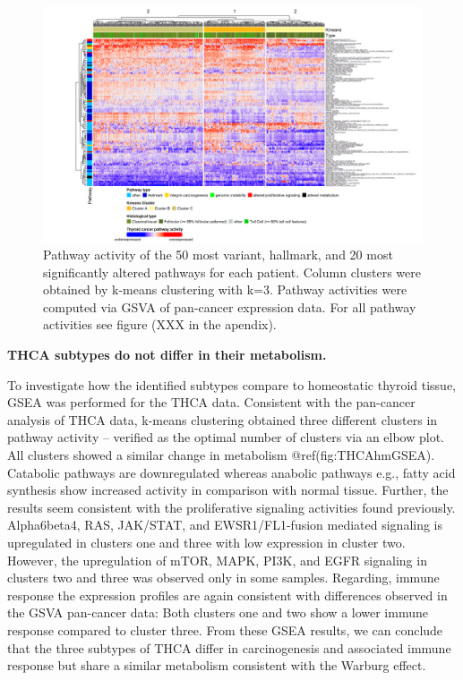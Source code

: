 \documentclass[
  parskip,
  oneside]{scrreprt}
\begin{document}
\begin{figure}

{\centering \includegraphics[width=1\linewidth]{figures/THCA Heatmap from Pancancer data top 50 pathways} 

}

\caption{Pathway activity of the 50 most variant, hallmark, and 20 most significantly altered pathways for each patient. Column clusters were obtained by k-means clustering with k=3. Pathway activities were computed via GSVA of pan-cancer expression data. For all pathway activities see figure (XXX in the apendix).}\label{fig:THCAhm}
\end{figure}

\textbf{THCA subtypes do not differ in their metabolism.}

To investigate how the identified subtypes compare to homeostatic
thyroid tissue, GSEA was performed for the THCA data. Consistent with
the pan-cancer analysis of THCA data, k-means clustering obtained three
different clusters in pathway activity -- verified as the optimal number
of clusters via an elbow plot. All clusters showed a similar change in
metabolism @ref(fig:THCAhmGSEA). Catabolic pathways are downregulated
whereas anabolic pathways e.g., fatty acid synthesis show increased
activity in comparison with normal tissue. Further, the results seem
consistent with the proliferative signaling activities found previously.
Alpha6beta4, RAS, JAK/STAT, and EWSR1/FL1-fusion mediated signaling is
upregulated in clusters one and three with low expression in cluster
two. However, the upregulation of mTOR, MAPK, PI3K, and EGFR signaling
in clusters two and three was observed only in some samples. Regarding,
immune response the expression profiles are again consistent with
differences observed in the GSVA pan-cancer data: Both clusters one and
two show a lower immune response compared to cluster three. From these
GSEA results, we can conclude that the three subtypes of THCA differ in
carcinogenesis and associated immune response but share a similar
metabolism consistent with the Warburg effect.
\end{document}
